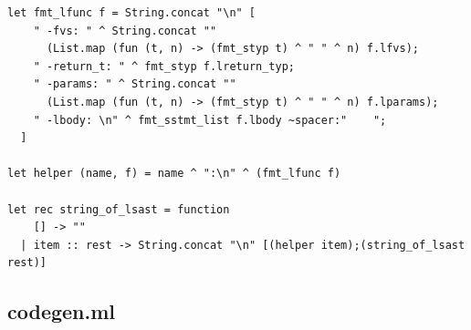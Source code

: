 \documentclass[12pt]{article}
\begin{document}
\begin{mdframed}[hidealllines=true,backgroundcolor=blue!20]
\begin{lstlisting}
let fmt_lfunc f = String.concat "\n" [
    " -fvs: " ^ String.concat "" 
      (List.map (fun (t, n) -> (fmt_styp t) ^ " " ^ n) f.lfvs);
    " -return_t: " ^ fmt_styp f.lreturn_typ;
    " -params: " ^ String.concat "" 
      (List.map (fun (t, n) -> (fmt_styp t) ^ " " ^ n) f.lparams);
    " -lbody: \n" ^ fmt_sstmt_list f.lbody ~spacer:"    ";
  ]

let helper (name, f) = name ^ ":\n" ^ (fmt_lfunc f)

let rec string_of_lsast = function
    [] -> ""
  | item :: rest -> String.concat "\n" [(helper item);(string_of_lsast rest)]
\end{lstlisting}
\end{mdframed}
\subsection{codegen.ml}
\end{document}
